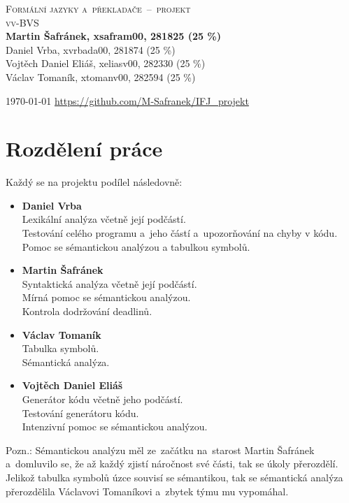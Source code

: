 \documentclass[a4paper, 12pt]{article}
\begin{document}
\begin{titlepage}

    \begin{center}
    \huge \textsc{Formální jazyky a~překladače~--~projekt} \\
    \vspace{0.1em}
    \Huge \textsc{vv-BVS} \\
    \Large \textbf{Martin Šafránek, xsafram00, 281825 (25 \%)} \\
    Daniel Vrba, xvrbada00, 281874 (25 \%)\\
    Vojtěch Daniel Eliáš, xeliasv00, 282330 (25 \%)\\
    Václav Tomaník, xtomanv00, 282594 (25 \%)\\
    \vspace{0.1em}
    \end{center}
    \Large \today
    \hfill
    \small\url{https://github.com/M-Safranek/IFJ_projekt}
    
\end{titlepage}

\tableofcontents
\newpage

\section{Rozdělení práce}
\label{sec:rozdeleni}
Každý se na projektu podílel následovně:

\begin{itemize}
    \item \textbf{Daniel Vrba}\\
    Lexikální analýza včetně její podčástí. \\
    Testování celého programu a~jeho částí a~upozorňování na chyby v kódu. \\
    Pomoc se sémantickou analýzou a tabulkou symbolů.

    \item \textbf{Martin Šafránek}\\
    Syntaktická analýza včetně její podčástí. \\
    Mírná pomoc se sémantickou analýzou. \\
    Kontrola dodržování deadlinů.

    \item \textbf{Václav Tomaník}\\
    Tabulka symbolů. \\
    Sémantická analýza.

    \item \textbf{Vojtěch Daniel Eliáš}\\
    Generátor kódu včetně jeho podčástí. \\
    Testování generátoru kódu. \\
    Intenzivní pomoc se sémantickou analýzou.
\end{itemize}
Pozn.: Sémantickou analýzu měl ze~začátku na~starost Martin Šafránek a~domluvilo se, že až každý zjistí náročnost své části, tak se úkoly přerozdělí. Jelikož tabulka symbolů úzce souvisí se sémantikou, tak se sémantická analýza přerozdělila Václavovi Tomaníkovi a~zbytek týmu mu vypomáhal.
\end{document}
